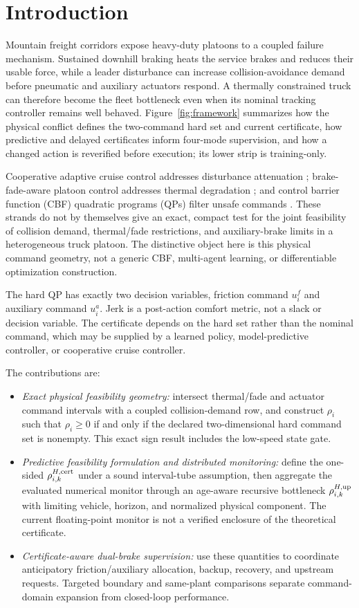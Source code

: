 \section{Introduction}
Mountain freight corridors expose heavy-duty platoons to a coupled failure mechanism. Sustained downhill braking heats the service brakes and reduces their usable force, while a leader disturbance can increase collision-avoidance demand before pneumatic and auxiliary actuators respond. A thermally constrained truck can therefore become the fleet bottleneck even when its nominal tracking controller remains well behaved. Figure~\ref{fig:framework} summarizes how the physical conflict defines the two-command hard set and current certificate, how predictive and delayed certificates inform four-mode supervision, and how a changed action is reverified before execution; its lower strip is training-only.

Cooperative adaptive cruise control addresses disturbance attenuation \cite{naus2010string,ploeg2011cacc}; brake-fade-aware platoon control addresses thermal degradation \cite{devika2022fade}; and control barrier function (CBF) quadratic programs (QPs) filter unsafe commands \cite{ames2017cbf,xiao2022hocbf}. These strands do not by themselves give an exact, compact test for the joint feasibility of collision demand, thermal/fade restrictions, and auxiliary-brake limits in a heterogeneous truck platoon. The distinctive object here is this physical command geometry, not a generic CBF, multi-agent learning, or differentiable optimization construction.

The hard QP has exactly two decision variables, friction command $u_i^f$ and auxiliary command $u_i^a$. Jerk is a post-action comfort metric, not a slack or decision variable. The certificate depends on the hard set rather than the nominal command, which may be supplied by a learned policy, model-predictive controller, or cooperative cruise controller.

The contributions are:
\begin{itemize}
\item \emph{Exact physical feasibility geometry:} intersect thermal/fade and actuator command intervals with a coupled collision-demand row, and construct $\rho_i$ such that $\rho_i\ge0$ if and only if the declared two-dimensional hard command set is nonempty. This exact sign result includes the low-speed state gate.
\item \emph{Predictive feasibility formulation and distributed monitoring:} define the one-sided $\rho_{i,k}^{H,{\rm cert}}$ under a sound interval-tube assumption, then aggregate the evaluated numerical monitor through an age-aware recursive bottleneck $\rho_{i,k}^{H,{\rm up}}$ with limiting vehicle, horizon, and normalized physical component. The current floating-point monitor is not a verified enclosure of the theoretical certificate.
\item \emph{Certificate-aware dual-brake supervision:} use these quantities to coordinate anticipatory friction/auxiliary allocation, backup, recovery, and upstream requests. Targeted boundary and same-plant comparisons separate command-domain expansion from closed-loop performance.
\end{itemize}

